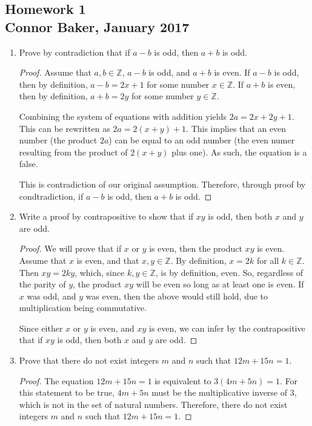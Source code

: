 \documentclass[10pt]{article}
\theoremstyle{definition}
\theoremstyle{plain}
\newcommand{\Z}{\mathbb{Z}}
\begin{document}
\begin{center}
\subsection*{Homework 1\\Connor Baker, January 2017}
\end{center}

\begin{enumerate}
\item Prove by contradiction that if $a-b$ is odd, then $a+b$ is odd.
  \begin{proof}
    Assume that $a,b\in\Z$, $a-b$ is odd, and $a+b$ is even. If $a-b$ is odd, then by definition, $a-b=2x+1$ for some number $x\in\Z$. If $a+b$ is even, then by definition, $a+b=2y$ for some number $y\in\Z$.

    \par Combining the system of equations with addition yields $2a=2x+2y+1$. This can be rewritten as $2a = 2(x+y) + 1$. This implies that an even number (the product $2a$) can be equal to an odd number (the even numer resulting from the product of $2(x+y)$ plus one). As such, the equation is a false.

    \par This is contradiction of our original assumption. Therefore, through proof by condtradiction, if $a-b$ is odd, then $a+b$ is odd.
  \end{proof}

\item Write a proof by contrapositive to show that if $xy$ is odd, then both $x$ and $y$ are odd.
  \begin{proof}
    We will prove that if $x$ or $y$ is even, then the product $xy$ is even. Assume that $x$ is even, and that $x,y\in\Z$. By definition, $x=2k$ for all $k\in\Z$. Then $xy=2ky$, which, since $k,y\in\Z$, is by definition, even. So, regardless of the parity of $y$, the product $xy$ will be even so long as at least one is even. If $x$ was odd, and $y$ was even, then the above would still hold, due to multiplication being commutative.

    \par Since either $x$ or $y$ is even, and $xy$ is even, we can infer by the contrapositive that if $xy$ is odd, then both $x$ and $y$ are odd.
  \end{proof}

\item Prove that there do not exist integers $m$ and $n$ such that $12m + 15n = 1$.
  \begin{proof}
    The equation $12m + 15n = 1$ is equivalent to $3(4m+5n)=1$. For this statement to be true, $4m+5n$ must be the multiplicative inverse of $3$, which is not in the set of natural numbers. Therefore, there do not exist integers $m$ and $n$ such that $12m + 15n = 1$.
  \end{proof}


\end{enumerate}
\end{document}

